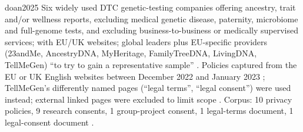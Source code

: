 \begin{papercard}{doan2025}
 Six widely used DTC genetic-testing companies offering ancestry, trait and/or wellness reports, excluding medical genetic disease, paternity, microbiome and full-genome tests, and excluding business-to-business or medically supervised services; with EU/UK websites; global leaders plus EU-specific providers (23andMe, AncestryDNA, MyHeritage, FamilyTreeDNA, LivingDNA, TellMeGen) ``to try to gain a representative sample'' . Policies captured from the EU or UK English websites between December 2022 and January 2023 ; TellMeGen's differently named pages (``legal terms'', ``legal consent'') were used instead; external linked pages were excluded to limit scope . Corpus: 10 privacy policies, 9 research consents, 1 group-project consent, 1 legal-terms document, 1 legal-consent document .


\end{papercard}
